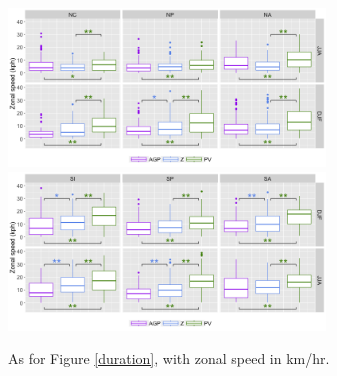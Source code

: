 \documentclass[smallextended]{svjour3}       %
\numberwithin{equation}{section}
\begin{document}
\begin{figure}
    \centering
    \includegraphics[width=0.75\textwidth]{fig_speed_NH.png}
        \includegraphics[width=0.75\textwidth]{fig_speed_SH.png}
    \caption{As for Figure \ref{duration}, with zonal speed in km/hr.}
    \label{shspeed}
\end{figure}

\end{document}
